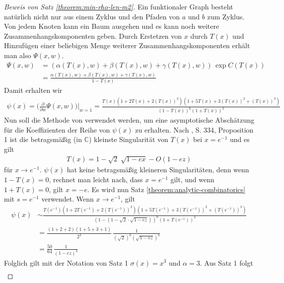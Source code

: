 \documentclass[a4paper, 10pt, ngerman]{article}
\newcommand{\C}{\mathbb{C}}
\begin{document}
\begin{proof}[Beweis von Satz \ref{theorem:min-rho-len-m2}]
    Ein funktionaler Graph besteht natürlich nicht nur aus einem Zyklus und den Pfaden von $a$ und $b$ zum Zyklus. Von jedem Knoten kann ein Baum ausgehen und es kann noch weitere Zusammenhangskomponenten geben. Durch Erstetzen von $x$ durch $T(x)$ und Hinzufügen einer beliebigen Menge weiterer Zusammenhangskomponenten erhält man also $\Psi(x, w)$.
    \begin{align*}
        \Psi(x, w)
         & = (\alpha(T(x), w) + \beta(T(x), w) + \gamma(T(x), w)) \,
        \exp C(T(x))                                                    \\
         & = \frac {\alpha(T(x), w) + \beta(T(x), w) + \gamma(T(x), w)}
        {1 - T(x)}
    \end{align*}
    Damit erhalten wir
    \begin{align*}
        \psi(x) = \Bigg (\frac {\partial} {\partial w}
        \Psi(x, w) \Bigg ) \Bigg \vert_{w = 1}
        = \frac
        {T(x)(1 + 2T(x) + 2(T(x))^2)(1 + 5T(x) + 3(T(x))^2 + (T(x))^3)}
        {(1 - T(x))^6(1 + T(x))^3}
    \end{align*}
    Nun soll die Methode von \cite{fo90} verwendet werden, um eine asymptotische Abschätzung für die Koeffizienten der Reihe von $\psi(x)$ zu erhalten. Nach \cite{fo90}, S. 334, Proposition 1 ist die betragsmäßig (in $\C$) kleinste Singularität von $T(x)$ bei $x = e^{-1}$ und es gilt
    \begin{align*}
        T(x) = 1 - \sqrt{2} \; \sqrt {1 - ex} - O(1 - ez)
    \end{align*}
    für $x \to e^{-1}$. $\psi(x)$ hat keine betragsmäßig kleineren Singularitäten, denn wenn $1 - T(x) = 0$, rechnet man leicht nach, dass $x = e^{-1}$ gilt, und wenn $1 + T(x) = 0$, gilt $x = -e$. Es wird nun Satz \ref{theorem:analytic-combinatorics} mit $s = e^{-1}$ verwendet. Wenn $x \to e^{-1}$, gilt
    \begin{align*}
        \psi(x)
         & \sim \frac {T(e^{-1})(1 + 2T(e^{-1})
            + 2(T(e^{-1}))^2)(1 + 5T(e^{-1}) + 3(T(e^{-1}))^2 + (T(e^{-1}))^3)}
        {(1 - (1 - \sqrt 2 \cdot \sqrt {1 - ez}))^6(1 + T(e^{-1}))^3} \\
         & = \frac {(1 + 2 + 2)(1 + 5 + 3 + 1)} {2^3} \,
        \frac 1 {(\sqrt 2 )^6 (\sqrt{1 - ez})^6}                      \\
         & = \frac {50} {64} \, \frac 1 {(1 - ez)^3}
    \end{align*}
    Folglich gilt mit der Notation von Satz 1 $\sigma(x) = x^3$ und $\alpha = 3$. Aus Satz 1 folgt
    \begin{align*}

\end{align*}
\end{proof}
\end{document}
